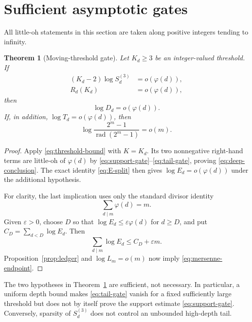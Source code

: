 \documentclass[11pt]{article}
\newtheorem{theorem}{Theorem}[section]
\theoremstyle{remark}
\DeclareMathOperator{\rad}{rad}
\newcommand{\eps}{\varepsilon}
\begin{document}
\section{Sufficient asymptotic gates}
\label{sec:gates}

All little-oh statements in this section are taken along positive integers
tending to infinity.

\begin{theorem}[Moving-threshold gate]
\label{thm:moving-threshold}
Let $K_d\ge3$ be an integer-valued threshold.  If
\begin{align}
 (K_d-2)\log S_d^{(3)}&=o(\varphi(d)),
 \label{eq:support-gate}\\
 R_d(K_d)&=o(\varphi(d)),
 \label{eq:tail-gate}
\end{align}
then
\begin{equation}
                         \log D_d=o(\varphi(d)).
 \label{eq:deep-conclusion}
\end{equation}
If, in addition, $\log T_d=o(\varphi(d))$, then
\begin{equation}
 \log\frac{2^m-1}{\rad(2^m-1)}=o(m).
 \label{eq:mersenne-endpoint}
\end{equation}
\end{theorem}

\begin{proof}
Apply \eqref{eq:threshold-bound} with $K=K_d$.  Its two nonnegative
right-hand terms are little-oh of $\varphi(d)$ by
\eqref{eq:support-gate}--\eqref{eq:tail-gate}, proving
\eqref{eq:deep-conclusion}.  The exact identity \eqref{eq:E-split} then
gives $\log E_d=o(\varphi(d))$ under the additional hypothesis.

For clarity, the last implication uses only the standard divisor identity
\[
                         \sum_{d\mid m}\varphi(d)=m.
\]
Given $\eps>0$, choose $D$ so that
$\log E_d\le\eps\varphi(d)$ for $d\ge D$, and put
$C_D=\sum_{d<D}\log E_d$.  Then
\[
 \sum_{d\mid m}\log E_d\le C_D+\eps m.
\]
Proposition~\ref{prop:ledger} and $\log L_m=o(m)$ now imply
\eqref{eq:mersenne-endpoint}.
\end{proof}

The two hypotheses in Theorem~\ref{thm:moving-threshold} are sufficient,
not necessary.  In particular, a uniform depth bound makes
\eqref{eq:tail-gate} vanish for a fixed sufficiently large threshold but
does not by itself prove the support estimate \eqref{eq:support-gate}.
Conversely, sparsity of $S_d^{(3)}$ does not control an unbounded high-depth
tail.
\end{document}

